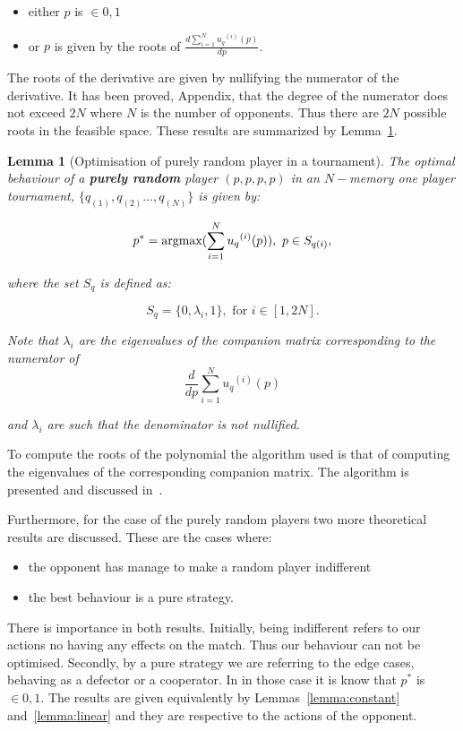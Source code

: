 \documentclass[10pt]{article}
\newtheorem{lemma}[theorem]{Lemma}
\begin{document}
\begin{itemize}
    \item either \(p\) is \(\in {0, 1}\)
    \item or \(p\) is given by the roots of \(\frac{d \sum\limits_{i=1} ^ {N} {u_q}^{(i)} (p)}{dp}\).
\end{itemize}

The roots of the derivative are given by nullifying the numerator of the derivative.
It has been proved, Appendix, that the degree of the numerator does not exceed
\(2 N\) where \(N\) is the number of opponents. Thus there are \(2N\) possible
roots in the feasible space. These results are summarized by Lemma~\ref{lemma:purely_optimisation}.

\begin{lemma}[Optimisation of purely random player in a tournament]
    \label{lemma:purely_optimisation}
    The optimal behaviour of a \textbf{purely random} player \((p, p, p, p)\)
    in an \(N-\)memory one player tournament, \(\{q_{(1)}, q_{(2)} \dots,q_{(N)} \}
    \) is given by:
    
    \[p^* = \textnormal{argmax}(\sum_{i=1} ^ {N} {u_q}^{(i)} (p) ), \ p \in S_{q(i)},\]
    
    where the set \(S_{q}\) is defined as:
    
    \[S_{q} = \{0, \lambda_i, 1\},\text{ for } i \in [1, 2N].\]

    Note that \(\lambda_i\) are the eigenvalues of the companion matrix corresponding
    to the numerator of \[\frac{d}{dp} \sum_{i=1} ^ {N} {u_q}^{(i)} (p)\]

    and \(\lambda_i\) are such that the denominator is not nullified.
    \end{lemma}

To compute the roots of the polynomial the algorithm used is that of computing the
eigenvalues of the corresponding companion matrix. The algorithm is presented
and discussed in~\cite{Edelman1995}.

Furthermore, for the case of the purely random players two more theoretical results
are discussed. These are the cases where:

\begin{itemize}
    \item the opponent has manage to make a random player indifferent
    \item the best behaviour is a pure strategy.
\end{itemize}

There is importance in both results. Initially, being indifferent refers to our
actions no having any effects on the match. Thus our behaviour can not be optimised.
Secondly, by a pure strategy we are referring to the edge cases, behaving as a
defector or a cooperator. In in those case it is know that \(p^*\) is \(\in {0, 1}\).
The results are given equivalently by Lemmas~\ref{lemma:constant} and~\ref{lemma:linear}
and they are respective to the actions of the opponent.
\end{document}
